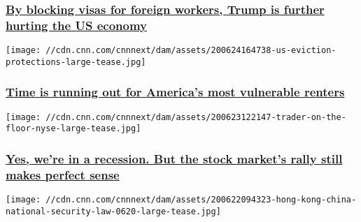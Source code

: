 \hypertarget{by-blocking-visas-for-foreign-workers-trump-is-further-hurting-the-us-economy}{%
\subsubsection{\texorpdfstring{\href{/2020/06/26/perspectives/work-visa-restrictions-us-economy/index.html}{By
blocking visas for foreign workers, Trump is further hurting the US
economy}}{By blocking visas for foreign workers, Trump is further hurting the US economy}}\label{by-blocking-visas-for-foreign-workers-trump-is-further-hurting-the-us-economy}}

\href{/2020/06/25/perspectives/eviction-protections-expiring-rental-assistance/index.html}{}

\texttt{[image: //cdn.cnn.com/cnnnext/dam/assets/200624164738-us-eviction-protections-large-tease.jpg]}

\hypertarget{time-is-running-out-for-americas-most-vulnerable-renters}{%
\subsubsection{\texorpdfstring{\href{/2020/06/25/perspectives/eviction-protections-expiring-rental-assistance/index.html}{Time
is running out for America's most vulnerable
renters}}{Time is running out for America's most vulnerable renters}}\label{time-is-running-out-for-americas-most-vulnerable-renters}}

\href{/2020/06/24/perspectives/recession-stock-market/index.html}{}

\texttt{[image: //cdn.cnn.com/cnnnext/dam/assets/200623122147-trader-on-the-floor-nyse-large-tease.jpg]}

\hypertarget{yes-were-in-a-recession-but-the-stock-markets-rally-still-makes-perfect-sense}{%
\subsubsection{\texorpdfstring{\href{/2020/06/24/perspectives/recession-stock-market/index.html}{Yes,
we're in a recession. But the stock market's rally still makes perfect
sense}}{Yes, we're in a recession. But the stock market's rally still makes perfect sense}}\label{yes-were-in-a-recession-but-the-stock-markets-rally-still-makes-perfect-sense}}

\href{/2020/06/22/perspectives/hong-kong-special-status-trump/index.html}{}

\texttt{[image: //cdn.cnn.com/cnnnext/dam/assets/200622094323-hong-kong-china-national-security-law-0620-large-tease.jpg]}

